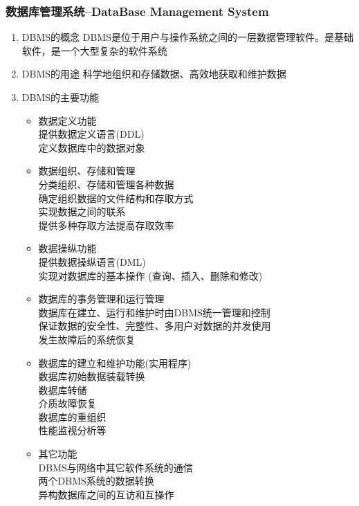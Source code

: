 \subsubsection{数据库管理系统–DataBase Management System}
\begin{enumerate}
\item DBMS的概念
DBMS是位于用户与操作系统之间的一层数据管理软件。是基础软件，是一个大型复杂的软件系统

\item DBMS的用途
科学地组织和存储数据、高效地获取和维护数据

\item DBMS的主要功能
\begin{itemize}
\item 数据定义功能\\
提供数据定义语言(DDL)\\
定义数据库中的数据对象\\

\item 数据组织、存储和管理\\
分类组织、存储和管理各种数据\\
确定组织数据的文件结构和存取方式\\
实现数据之间的联系\\
提供多种存取方法提高存取效率\\

\item 数据操纵功能\\
提供数据操纵语言(DML)\\
实现对数据库的基本操作 (查询、插入、删除和修改)\\

\item 数据库的事务管理和运行管理\\
数据库在建立、运行和维护时由DBMS统一管理和控制\\
保证数据的安全性、完整性、多用户对数据的并发使用\\
发生故障后的系统恢复\\

\item 数据库的建立和维护功能(实用程序)\\
数据库初始数据装载转换\\
数据库转储\\
介质故障恢复\\
数据库的重组织\\
性能监视分析等\\

\item 其它功能\\
DBMS与网络中其它软件系统的通信\\
两个DBMS系统的数据转换\\
异构数据库之间的互访和互操作\\
\end{itemize}
\end{enumerate}

